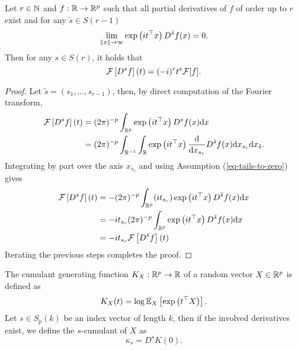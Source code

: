 \begin{lemma} \label{lemma-fourier-derivative}
    Let $r \in \N$ and $f : \R \rightarrow \Rp$ such that all partial derivatives of $f$ of order up to $r$ exist and for any $\tilde{s} \in S(r-1)$
    \begin{equation} \label{eq-tails-to-zero}
        \lim_{\norm{x} \rightarrow \infty} \expf{it^\top x}D^{\tilde{s}}f(x) = 0.
    \end{equation}
    Then for any $s \in S(r)$, it holds that
    \begin{equation*}
        \F\left[D^s f \right](t) = (-i)^r t^s \F[f].
    \end{equation*}
\end{lemma}
\begin{proof}
    Let $\tilde{s} = (s_1, \ldots, s_{r-1})$, then, by direct computation of the Fourier transform,
    \begin{align*}
        \F\left[D^s f \right](t) 
        &= (2\pi)^{-p}\intRp{x}{ \expf{it^\top x} D^s f(x) } \\
        &= (2\pi)^{-p}\int_{\R^{-1}} \int_\R 
            \expf{it^\top x} \ddx{x_{s_r}} D^{\tilde{s}} f(x) 
        \d x_{s_r} \d x_{\tilde{s}}.
    \end{align*}
    Integrating by part over the axis $x_{s_r}$ and using Assumption (\ref{eq-tails-to-zero}) gives
    \begin{align*}
        \F\left[D^s f \right](t)  
        &= - (2\pi)^{-p}\intRp{x}{
            (it_{s_r})\expf{it^\top x} D^{\tilde{s}} f(x)
        } \\
        &= -it_{s_r} (2\pi)^{-p}\intRp{x}{
            \expf{it^\top x} D^{\tilde{s}} f(x)
        } \\
        &= -it_{s_r} \F\left[D^{\tilde{s}} f \right](t)
    \end{align*}
    Iterating the previous steps completes the proof.
\end{proof}


\begin{definition}
    The cumulant generating function $K_X : \Rp \rightarrow \R$ of a random vector $X \in \Rp$ is defined as 
    \begin{equation*}
        K_X(t) = \log \expec{X}{\expf{t^\top X}}.
    \end{equation*}
    Let $s \in S_p(k)$ be an index vector of length $k$, then if the involved derivatives exist, we define the $s$-cumulant of $X$ as
    \begin{equation*}
        \kappa_s = D^s K(0).
    \end{equation*}
\end{definition}

